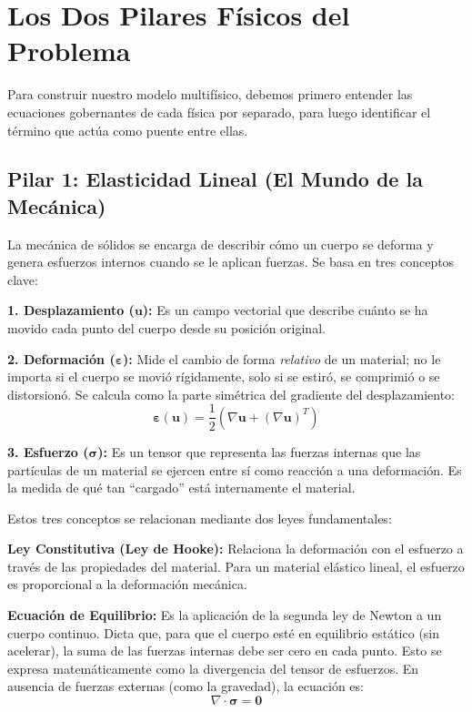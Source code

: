 \section{Los Dos Pilares Físicos del Problema}
Para construir nuestro modelo multifísico, debemos primero entender las ecuaciones gobernantes de cada física por separado, para luego identificar el término que actúa como puente entre ellas.

\subsection{Pilar 1: Elasticidad Lineal (El Mundo de la Mecánica)}
La mecánica de sólidos se encarga de describir cómo un cuerpo se deforma y genera esfuerzos internos cuando se le aplican fuerzas. Se basa en tres conceptos clave:

\textbf{1. Desplazamiento ($\mathbf{u}$):} Es un campo vectorial que describe cuánto se ha movido cada punto del cuerpo desde su posición original.

\textbf{2. Deformación ($\bm{\varepsilon}$):} Mide el cambio de forma \textit{relativo} de un material; no le importa si el cuerpo se movió rígidamente, solo si se estiró, se comprimió o se distorsionó. Se calcula como la parte simétrica del gradiente del desplazamiento:
\begin{equation}
    \bm{\varepsilon}(\mathbf{u}) = \frac{1}{2} \left( \nabla \mathbf{u} + (\nabla \mathbf{u})^T \right)
\end{equation}

\textbf{3. Esfuerzo ($\bm{\sigma}$):} Es un tensor que representa las fuerzas internas que las partículas de un material se ejercen entre sí como reacción a una deformación. Es la medida de qué tan ``cargado'' está internamente el material.

Estos tres conceptos se relacionan mediante dos leyes fundamentales:

\textbf{Ley Constitutiva (Ley de Hooke):} Relaciona la deformación con el esfuerzo a través de las propiedades del material. Para un material elástico lineal, el esfuerzo es proporcional a la deformación mecánica.

\textbf{Ecuación de Equilibrio:} Es la aplicación de la segunda ley de Newton a un cuerpo continuo. Dicta que, para que el cuerpo esté en equilibrio estático (sin acelerar), la suma de las fuerzas internas debe ser cero en cada punto. Esto se expresa matemáticamente como la divergencia del tensor de esfuerzos. En ausencia de fuerzas externas (como la gravedad), la ecuación es:
\begin{equation}
    \nabla \cdot \bm{\sigma} = \mathbf{0}
\end{equation}

